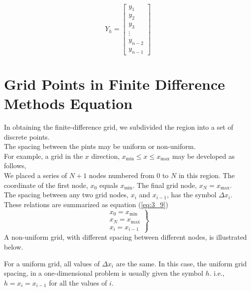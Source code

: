 \documentclass[12pt]{report}
\newcommand{\sps}{\\[0.2cm]}
\newcommand{\refn}[1]{(\ref{#1})}
\newcommand{\refx}[1]{\refn{eq:#1}}
\newcommand{\NI}{\noindent}
\begin{document}
	~\sps
	\begin{equation*}
		Y_h = 
		\begin{bmatrix}
			y_1\\
			y_2\\
			y_3\\
			\vdots\\
			y_{n-2}\\
			y_{n-1}
		\end{bmatrix}
	\end{equation*}
	
	
	\section{Grid Points in Finite Difference Methods Equation}
	In obtaining the finite-difference grid, we subdivided the region into a set of discrete points.\sps
	The spacing between the pints may be uniform or non-uniform.\sps
	
	\NI For example, a grid in the $x$ direction, $x_{\text{min}} \leq x \leq x_{\text{max}}$ may be developed as follows,\sps
	
	\NI We placed a series of $N+1$ nodes numbered from $0$ to $N$ in this region. The coordinate of the first node, $x_0$ equals $x_{\text{min}}$. The final grid node, $x_N = x_{\text{max}}$.\sps
	
	\NI The spacing between any two grid nodes, $x_i$ and $x_{i-1}$, has the symbol $\Delta x_i$. These relations are summarized as equation \refx{3_9}
	\begin{equation}
		\left.
			\begin{array}{c}
				x_0 = x_{\text{min}}\sps
				x_N = x_{\text{max}}\sps
				x_i = x_{i-1}
			\end{array}
		\right\}
		\label{eq:3_9}
	\end{equation}
	A non-uniform grid, with different spacing between different nodes, is illustrated below.
	\begin{center}
	\end{center}
	For a uniform grid, all values of $\Delta x_i$ are the same. In this case, the uniform grid spacing, in a one-dimensional problem is usually given the symbol $h$. i.e., $h=x_i = x_{i-1}$ for all the values of $i$.\sps
	
\end{document}

